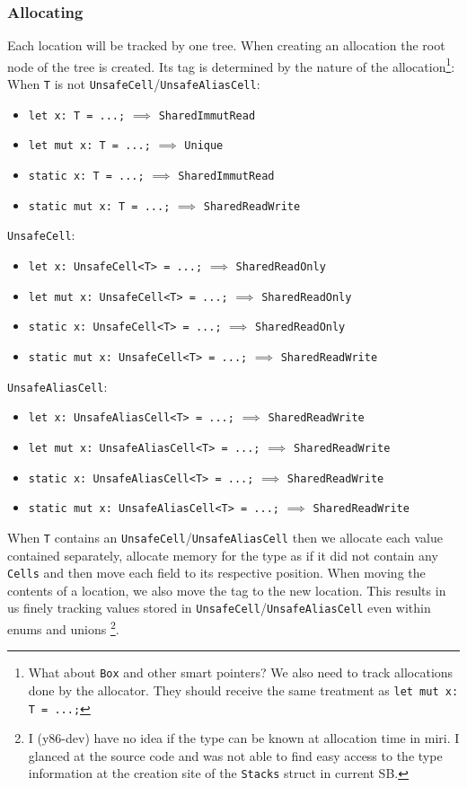 \documentclass[]{article}
\newcommand{\SHRW}{\texttt{SharedReadWrite} }
\newcommand{\SHRO}{\texttt{SharedReadOnly} }
\newcommand{\SHIR}{\texttt{SharedImmutRead} }
\newcommand{\UNQ}{\texttt{Unique} }
\begin{document}
\subsubsection{Allocating}
Each location will be tracked by one tree. When creating an allocation the root node of the tree is created. Its tag is
determined by the nature of the allocation\footnote{What about \texttt{Box} and other smart pointers? We also need to track allocations done by the allocator. They should receive the same treatment as \texttt{let mut x: T = ...;}}:\\
When \texttt{T} is not \texttt{UnsafeCell}/\texttt{UnsafeAliasCell}:
\begin{itemize}
    \item \texttt{let x: T = ...;} $\implies$ \SHIR
    \item \texttt{let mut x: T = ...;} $\implies$ \UNQ
    \item \texttt{static x: T = ...;} $\implies$ \SHIR
    \item \texttt{static mut x: T = ...;} $\implies$ \SHRW
\end{itemize}
\texttt{UnsafeCell}:
\begin{itemize}
\item \texttt{let x: UnsafeCell<T> = ...;} $\implies$ \SHRO
\item \texttt{let mut x: UnsafeCell<T> = ...;} $\implies$ \SHRO
\item \texttt{static x: UnsafeCell<T> = ...;} $\implies$ \SHRO
\item \texttt{static mut x: UnsafeCell<T> = ...;} $\implies$ \SHRW
\end{itemize}
\texttt{UnsafeAliasCell}:
\begin{itemize}
\item \texttt{let x: UnsafeAliasCell<T> = ...;} $\implies$ \SHRW
\item \texttt{let mut x: UnsafeAliasCell<T> = ...;} $\implies$ \SHRW
\item \texttt{static x: UnsafeAliasCell<T> = ...;} $\implies$ \SHRW
\item \texttt{static mut x: UnsafeAliasCell<T> = ...;} $\implies$ \SHRW
\end{itemize}
When \texttt{T} contains an \texttt{UnsafeCell}/\texttt{UnsafeAliasCell} then we allocate each value contained separately,
allocate memory for the type as if it did not contain any \texttt{Cells} and then move each field to its respective position.
When moving the contents of a location, we also move the tag to the new location.
This results in us finely tracking values stored in \texttt{UnsafeCell}/\texttt{UnsafeAliasCell}
even within enums and unions \footnote{I (y86-dev) have no idea if the type can be known at allocation time in miri. I glanced at the source code and was not able to find easy
    access to the type information at the creation site of the \texttt{Stacks} struct in current SB.}.
\end{document}
